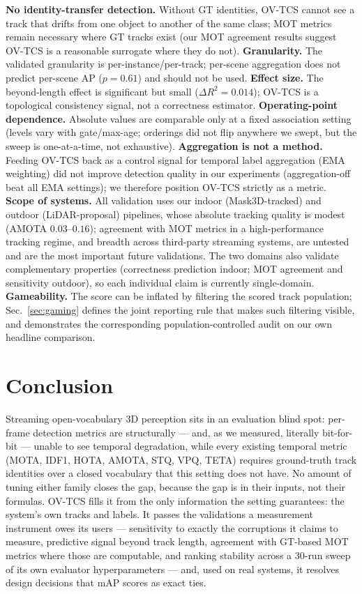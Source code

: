 \documentclass[10pt,twocolumn,letterpaper]{article}
\begin{document}
\textbf{No identity-transfer detection.} Without GT identities, OV-TCS cannot
see a track that drifts from one object to another of the same class; MOT
metrics remain necessary where GT tracks exist (our MOT agreement results
suggest OV-TCS is a reasonable surrogate where they do not).
\textbf{Granularity.} The validated granularity is per-instance/per-track;
per-scene aggregation does not predict per-scene AP ($p{=}0.61$) and should
not be used.
\textbf{Effect size.} The beyond-length effect is significant but small
($\Delta R^2{=}0.014$); OV-TCS is a topological consistency signal, not a
correctness estimator.
\textbf{Operating-point dependence.} Absolute values are comparable only at a
fixed association setting (levels vary with gate/max-age; orderings did not
flip anywhere we swept, but the sweep is one-at-a-time, not exhaustive).
\textbf{Aggregation is not a method.} Feeding OV-TCS back as a control signal
for temporal label aggregation (EMA weighting) did not improve detection
quality in our experiments (aggregation-off beat all EMA settings); we
therefore position OV-TCS strictly as a metric.
\textbf{Scope of systems.} All validation uses our indoor (Mask3D-tracked)
and outdoor (LiDAR-proposal) pipelines, whose absolute tracking quality is
modest (AMOTA $0.03$--$0.16$); agreement with MOT metrics in a
high-performance tracking regime, and breadth across third-party streaming
systems, are untested and are the most important future validations. The two
domains also validate complementary properties (correctness prediction
indoor; MOT agreement and sensitivity outdoor), so each individual claim is
currently single-domain.
\textbf{Gameability.} The score can be inflated by filtering the scored track
population; Sec.~\ref{sec:gaming} defines the joint reporting rule that makes
such filtering visible, and demonstrates the corresponding
population-controlled audit on our own headline comparison.

\section{Conclusion}
Streaming open-vocabulary 3D perception sits in an evaluation blind spot:
per-frame detection metrics are structurally --- and, as we measured,
literally bit-for-bit --- unable to see temporal degradation, while every
existing temporal metric (MOTA, IDF1, HOTA, AMOTA, STQ, VPQ, TETA) requires
ground-truth track identities over a closed vocabulary that this setting does
not have. No amount of tuning either family closes the gap, because the gap
is in their inputs, not their formulas. OV-TCS fills it from the only
information the setting guarantees: the system's own tracks and labels. It
passes the validations a measurement instrument owes its users ---
sensitivity to exactly the corruptions it claims to measure, predictive
signal beyond track length, agreement with GT-based MOT metrics where those
are computable, and ranking stability across a 30-run sweep of its own
evaluator hyperparameters --- and, used on real systems, it resolves design
decisions that mAP scores as exact ties.
\end{document}
